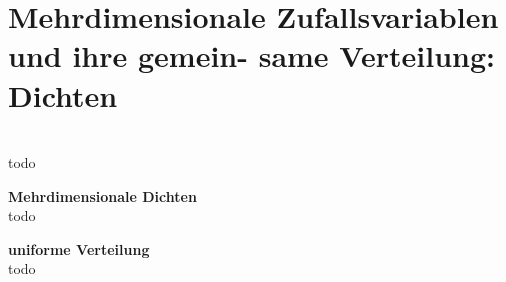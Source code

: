 \section{Mehrdimensionale Zufallsvariablen und ihre gemein-
same Verteilung: Dichten}\label{sec:mehrdimensionale-zufallsvariablen-und-ihre-gemein-
same-verteilung:-dichten}

\begin{bsp}   \\
todo  %
\end{bsp}

\begin{defi} \textbf{Mehrdimensionale Dichten}
  \\
todo  %
\end{defi}

\begin{defi} \textbf{uniforme Verteilung}
  \\
todo  %
\end{defi}

\newpage
